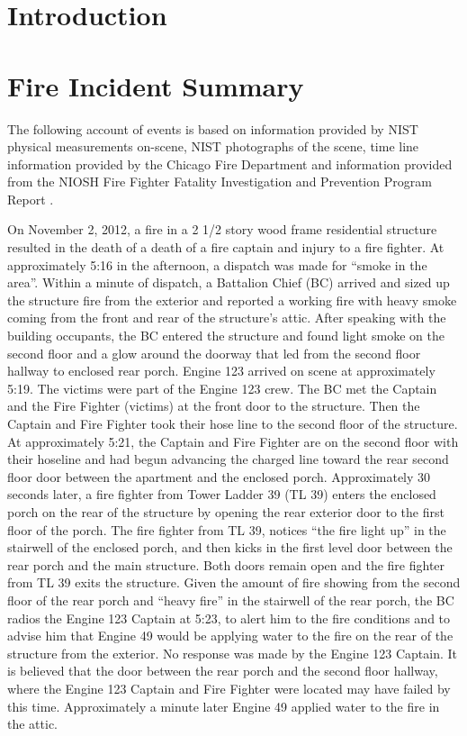 \documentclass[11pt,oneside]{book}
\begin{document}
\mainmatter

\chapter{Introduction}

\chapter{Fire Incident Summary}
The following account of events is based on information provided by NIST physical measurements on-scene, NIST photographs of the scene, time line information provided by the Chicago Fire Department and information provided from the NIOSH Fire Fighter Fatality Investigation and Prevention Program Report \cite{NIOSH:Bowyer}.

On November 2, 2012, a fire in a 2 1/2 story wood frame residential structure resulted in the death of a death of a fire captain and injury to a fire fighter.  At approximately 5:16 in the afternoon, a dispatch was made for ``smoke in the area''.   Within a minute of dispatch, a Battalion Chief (BC) arrived and sized up the structure fire from the exterior and reported a working fire with heavy smoke coming from the front and rear of the structure's attic.  After speaking with the building occupants, the BC entered the structure and found light smoke on the second floor and a glow around the doorway that led from the second floor hallway to enclosed rear porch.  Engine 123 arrived on scene at approximately 5:19. The victims were part of the Engine 123 crew.  The BC met the Captain and the Fire Fighter (victims) at the front door to the structure.  Then the Captain and Fire Fighter took their hose line to the second floor of the structure.  At approximately 5:21, the Captain and Fire Fighter are on the second floor with their hoseline and had begun advancing the charged line toward the rear second floor door between the apartment and the enclosed porch.   Approximately 30 seconds later, a fire fighter from Tower Ladder 39 (TL 39) enters the enclosed porch on the rear of the structure by opening the rear exterior door to the first floor of the porch.   The fire fighter from TL 39, notices ``the fire light up'' in the stairwell of the enclosed porch, and then kicks in the first level door between the rear porch and the main structure.   Both doors remain open and the fire fighter from TL 39 exits the structure.  Given the amount of fire showing from the second floor of the rear porch and ``heavy fire'' in the stairwell of the rear porch, the BC radios the Engine 123 Captain at 5:23, to alert him to the fire conditions and to advise him that Engine 49 would be applying water to the fire on the rear of the structure from the exterior.  No response was made by the Engine 123 Captain.  It is believed that the door between the rear porch and the second floor hallway, where the Engine 123 Captain and Fire Fighter were located may have failed by this time.  Approximately a minute later Engine 49 applied water to the fire in the attic.
\end{document}
